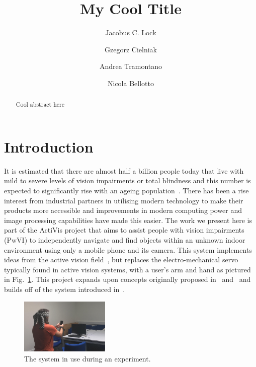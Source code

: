 \documentclass[runningheads]{llncs}
\begin{document}
\title{My Cool Title}

\author{Jacobus C. Lock \and
  Gzegorz Cielniak \and
  Andrea Tramontano \and
  Nicola Bellotto
}

\maketitle

\begin{abstract}
  Cool abstract here
\end{abstract}

\section{Introduction}

It is estimated that there are almost half a billion people today that live with mild to severe levels of vision impairments or total blindness and this number is expected to significantly rise with an ageing population~\cite{bourne2017magnitude}. There has been a rise interest from industrial partners in utilising modern technology to make their products more accessible and improvements in modern computing power and image processing capabilities have made this easier. The work we present here is part of the ActiVis project that aims to assist people with vision impairments (PwVI) to independently navigate and find objects within an unknown indoor environment using only a mobile phone and its camera. This system implements ideas from the active vision field~\cite{bajcsy2017,bellotto2013}, but replaces the electro-mechanical servo typically found in active vision systems, with a user's arm and hand as pictured in Fig.~\ref{fig:system-in-use}. This project expands upon concepts originally proposed in~\cite{bellotto2013} and~\cite{lock2017portable} and builds off of the system introduced in~\cite{lock2019active}.

\begin{figure}
  \centering
  \includegraphics[width=0.38\textwidth]{figures/system_use.png}
  \caption{The system in use during an experiment. }\label{fig:system-in-use}
\end{figure}
\end{document}
